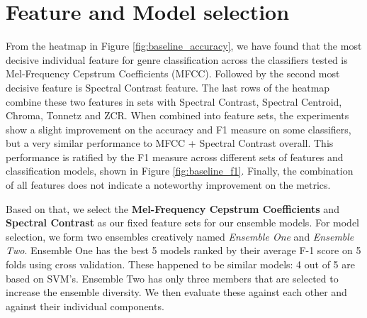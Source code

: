 \section{Feature and Model selection}

\begin{figure*}
    \centering
    \vspace{-2em}
    \begin{minipage}{0.6\textwidth}
        
        \caption{Models vs. Features Sets and their Accuracy-measures on the validation set [0-100\%].}
        \label{fig:baseline_accuracy}
    \end{minipage}
    \vspace{-2em}
    \begin{minipage}{0.6\textwidth}
        
        \caption{Models vs. Features Sets and their F1-measures on the validation set [0-100\%].}
        \label{fig:baseline_f1}
    \end{minipage}
\end{figure*}

From the heatmap in Figure \ref{fig:baseline_accuracy}, we have found that the most decisive individual feature for genre classification across the classifiers tested is Mel-Frequency Cepstrum Coefficients (MFCC). Followed by the second most decisive feature is Spectral Contrast feature. The last rows of the heatmap combine these two features in sets with Spectral Contrast, Spectral Centroid, Chroma, Tonnetz and ZCR. When combined into feature sets, the experiments show a slight improvement on the accuracy and F1 measure on some classifiers, but a very similar performance to MFCC + Spectral Contrast overall. This performance is ratified by the F1 measure across different sets of features and classification models, shown in Figure \ref{fig:baseline_f1}. Finally, the combination of all features does not indicate a noteworthy improvement on the metrics.

Based on that, we select the \textbf{Mel-Frequency Cepstrum Coefficients} and \textbf{Spectral Contrast} as our fixed feature sets for our ensemble models. For model selection, we form two ensembles creatively named \textit{Ensemble One} and \textit{Ensemble Two}. Ensemble One has the best 5 models ranked by their average F-1 score on 5 folds using cross validation. These happened to be similar models: 4 out of 5 are based on SVM's. Ensemble Two has only three members that are selected to increase the ensemble diversity. We then evaluate these against each other and against their individual components.

